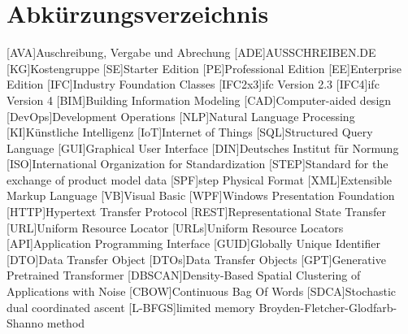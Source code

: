 \chapter{Abkürzungsverzeichnis}
\begin{acronym}
[AVA]{Auschreibung, Vergabe und Abrechung}
[ADE]{AUSSCHREIBEN.DE}
[KG]{Kostengruppe}
[SE]{Starter Edition}
[PE]{Professional Edition}
[EE]{Enterprise Edition}
[IFC]{Industry Foundation Classes}
[IFC2x3]{\ac{ifc} Version 2.3}
[IFC4]{\ac{ifc} Version 4}
[BIM]{Building Information Modeling}
[CAD]{Computer-aided design}
[DevOps]{Development Operations}
[NLP]{Natural Language Processing}
[KI]{Künstliche Intelligenz}
[IoT]{Internet of Things}
[SQL]{Structured Query Language}
[GUI]{Graphical User Interface}
[DIN]{Deutsches Institut für Normung}
[ISO]{International Organization for Standardization}
[STEP]{Standard for the exchange of product model data}
[SPF]{\ac{step} Physical Format}
[XML]{Extensible Markup Language}
[VB]{Visual Basic}
[WPF]{Windows Presentation Foundation}
[HTTP]{Hypertext Transfer Protocol}
[REST]{Representational State Transfer}
[URL]{Uniform Resource Locator}
[URLs]{Uniform Resource Locators}
[API]{Application Programming Interface}
[GUID]{Globally Unique Identifier}
[DTO]{Data Transfer Object}
[DTOs]{Data Transfer Objects}
[GPT]{Generative Pretrained Transformer}
[DBSCAN]{Density-Based Spatial Clustering of Applications with Noise}
[CBOW]{Continuous Bag Of Words}
[SDCA]{Stochastic dual coordinated ascent}
[L-BFGS]{limited memory Broyden-Fletcher-Glodfarb-Shanno method}
\end{acronym}